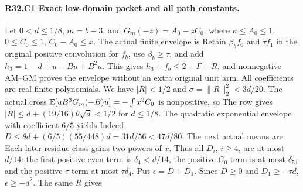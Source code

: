 \paragraph{R32.C1 Exact low-domain packet and all path constants.}
Let \(0<d\le1/8\), \(m=b-3\), and \(G_m(-z)=A_0-zC_0\), where
\(\kappa\le A_0\le1\), \(0\le C_0\le1\), \(C_0-A_0\le x\).
The actual finite envelope is
Retain \(\beta_bf_0\) and \(\tau f_1\) in the original positive
convolution for \(f_b\), use \(\beta_b\ge\tau\), and add
\(h_3=1-d+u-Bu+B^2u\). This gives \(h_3+f_b\le2-\Gamma+R\), and
nonnegative AM--GM proves the envelope without an extra original unit arm.
All coefficients are real finite polynomials. We have \(|R|<1/2\) and
\(\sigma=\lVert R\rVert_2^2<3d/20\). The actual cross
\(\mathbb E[uB^3G_m(-B)u]=-\int x^2C_0\) is nonpositive, so
The row gives \(|R|\le d+(19/16)\theta\sqrt d<1/2\) for \(d\le1/8\).
The quadratic exponential envelope with coefficient \(6/5\) yields
Indeed \(D\le\theta d+(6/5)(55/448)d=31d/56<47d/80\).
The next actual means are
Each later residue class gains two powers of \(x\). Thus all \(D_i\),
\(i\ge4\), are at most \(d/14\): the first positive even term is
\(\delta_4<d/14\), the positive \(C_0\) term is at most \(\delta_5\),
and the positive \(\tau\) term at most \(\tau\delta_4\).
Put \(\epsilon=D+D_1\). Since \(D\ge0\) and \(D_1\ge-\tau d\),
\(\epsilon\ge-d^2\). The same \(R\) gives
